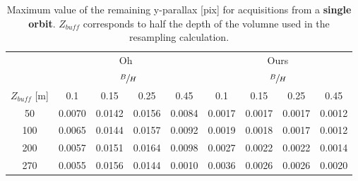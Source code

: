 \documentclass{ipol}
\begin{document}
\begin{table}[h!]

\begin{center}
\begin{tabular}{|c|c|c|c|c||c|c|c|c|}

\multicolumn{1}{c}{}  & \multicolumn{4}{c}{Oh~\cite{Oh2011}} & \multicolumn{4}{c}{Ours}   \\
 \cline{2-9} 
 \multicolumn{1}{c}{}  & \multicolumn{4}{|c||}{ $\sfrac{B}{H}$ } & \multicolumn{4}{|c|}{$\sfrac{B}{H}$ }  \\
 \multicolumn{1}{c|}{$Z_{buff}$ [m]}  &  0.1 &  0.15   & 0.25  &  0.45 &  0.1 &  0.15   & 0.25  &  0.45   \\
 \cline{1-9}
  
 50 & 0.0070  & 0.0142    & 0.0156   &  0.0084   &  0.0017   &  0.0017  & 0.0017  & 0.0012\\
100 & 0.0065  & 0.0144    & 0.0157   &  0.0092   &  0.0019   &  0.0018  & 0.0017  & 0.0012\\
200 & 0.0057  & 0.0151    & 0.0164   &  0.0098   &  0.0027   &  0.0022  & 0.0022  & 0.0014\\
270 & 0.0055  & 0.0156    & 0.0144   &  0.0010   &  0.0036   &  0.0026  & 0.0026  & 0.0020\\
\hline 

\end{tabular}
\end{center}
\caption{Maximum value of the remaining y-parallax [pix] for acquisitions from a \textbf{single orbit}. $Z_{buff}$ corresponds to half the depth of the volumne used in the resampling calculation.}\label{tab:PHR1mono}
\end{table}
\end{document}
